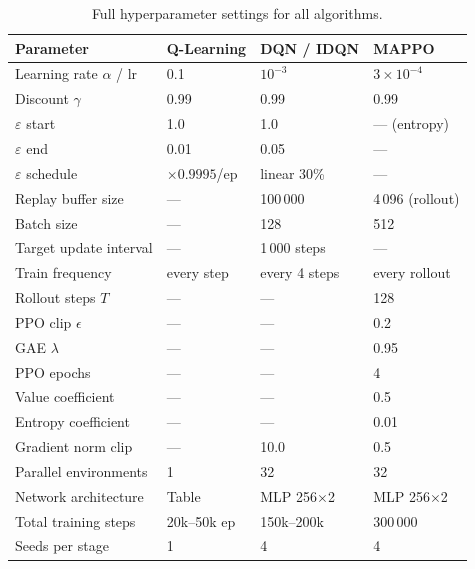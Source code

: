 \documentclass[12pt]{article}
\newcommand{\discount}{\gamma}
\begin{document}
\begin{table}[H]
\centering
\caption{Full hyperparameter settings for all algorithms.}
\label{tab:hparams}
\renewcommand{\arraystretch}{1.2}
\begin{tabular}{llll}
\toprule
\textbf{Parameter} & \textbf{Q-Learning} & \textbf{DQN / IDQN} & \textbf{MAPPO} \\
\midrule
Learning rate $\alpha$ / lr  & 0.1        & $10^{-3}$     & $3 \times 10^{-4}$ \\
Discount $\discount$          & 0.99       & 0.99          & 0.99               \\
$\varepsilon$ start           & 1.0        & 1.0           & — (entropy)        \\
$\varepsilon$ end             & 0.01       & 0.05          & —                  \\
$\varepsilon$ schedule        & $\times 0.9995$/ep & linear 30\%  & —           \\
Replay buffer size            & —          & 100\,000      & 4\,096 (rollout)   \\
Batch size                    & —          & 128           & 512                \\
Target update interval        & —          & 1\,000 steps  & —                  \\
Train frequency               & every step & every 4 steps & every rollout      \\
Rollout steps $T$             & —          & —             & 128                \\
PPO clip $\epsilon$           & —          & —             & 0.2                \\
GAE $\lambda$                 & —          & —             & 0.95               \\
PPO epochs                    & —          & —             & 4                  \\
Value coefficient             & —          & —             & 0.5                \\
Entropy coefficient           & —          & —             & 0.01               \\
Gradient norm clip            & —          & 10.0          & 0.5                \\
Parallel environments         & 1          & 32            & 32                 \\
Network architecture          & Table      & MLP 256$\times$2 & MLP 256$\times$2 \\
Total training steps          & 20k--50k ep & 150k--200k   & 300\,000           \\
Seeds per stage               & 1          & 4             & 4                  \\
\bottomrule
\end{tabular}
\end{table}
\end{document}
